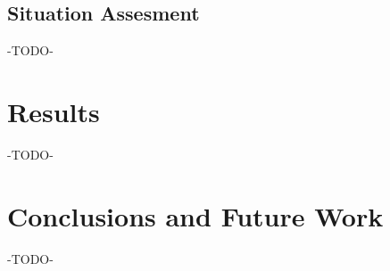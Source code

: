 \documentclass[10pt,twocolumn,letterpaper]{article}
\begin{document}
\subsection{Situation Assesment}

-TODO-

\section{Results}

-TODO-

\section{Conclusions and Future Work}

-TODO-

{\small


}
\end{document}
